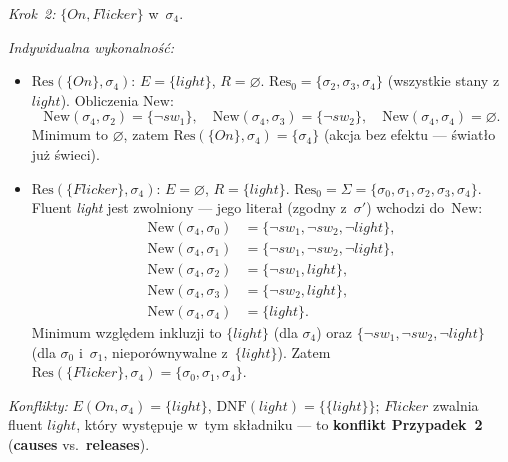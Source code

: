 \documentclass[11pt,a4paper]{article}
\newcommand{\causes}{\textbf{causes}}
\newcommand{\releases}{\textbf{releases}}
\newcommand{\DNF}{\mathrm{DNF}}
\theoremstyle{definition}
\begin{document}
\medskip
\noindent\textit{Krok~2:} $\{\mathit{On}, \mathit{Flicker}\}$ w~$\sigma_4$.

\smallskip\noindent
\emph{Indywidualna wykonalność:}
\begin{itemize}[topsep=2pt]
  \item $\mathrm{Res}(\{\mathit{On}\}, \sigma_4)$: $E = \{\mathit{light}\}$, $R = \varnothing$.
        $\mathrm{Res}_0 = \{\sigma_2, \sigma_3, \sigma_4\}$ (wszystkie stany z~$\mathit{light}$).
        Obliczenia $\mathrm{New}$:
        \[
          \mathrm{New}(\sigma_4, \sigma_2) = \{\neg\mathit{sw_1}\}, \quad
          \mathrm{New}(\sigma_4, \sigma_3) = \{\neg\mathit{sw_2}\}, \quad
          \mathrm{New}(\sigma_4, \sigma_4) = \varnothing.
        \]
        Minimum to $\varnothing$, zatem $\mathrm{Res}(\{\mathit{On}\}, \sigma_4) = \{\sigma_4\}$ (akcja bez efektu --- światło już świeci).
  \item $\mathrm{Res}(\{\mathit{Flicker}\}, \sigma_4)$: $E = \varnothing$, $R = \{\mathit{light}\}$.
        $\mathrm{Res}_0 = \Sigma = \{\sigma_0, \sigma_1, \sigma_2, \sigma_3, \sigma_4\}$.
        Fluent \textit{light} jest zwolniony --- jego literał (zgodny z~$\sigma'$) wchodzi do~$\mathrm{New}$:
        \begin{align*}
          \mathrm{New}(\sigma_4, \sigma_0) &= \{\neg\mathit{sw_1}, \neg\mathit{sw_2}, \neg\mathit{light}\}, \\
          \mathrm{New}(\sigma_4, \sigma_1) &= \{\neg\mathit{sw_1}, \neg\mathit{sw_2}, \neg\mathit{light}\}, \\
          \mathrm{New}(\sigma_4, \sigma_2) &= \{\neg\mathit{sw_1}, \mathit{light}\}, \\
          \mathrm{New}(\sigma_4, \sigma_3) &= \{\neg\mathit{sw_2}, \mathit{light}\}, \\
          \mathrm{New}(\sigma_4, \sigma_4) &= \{\mathit{light}\}.
        \end{align*}
        Minimum względem inkluzji to $\{\mathit{light}\}$ (dla $\sigma_4$) oraz
        $\{\neg\mathit{sw_1}, \neg\mathit{sw_2}, \neg\mathit{light}\}$ (dla $\sigma_0$ i~$\sigma_1$, nieporównywalne z~$\{\mathit{light}\}$).
        Zatem $\mathrm{Res}(\{\mathit{Flicker}\}, \sigma_4) = \{\sigma_0, \sigma_1, \sigma_4\}$.
\end{itemize}

\smallskip\noindent
\emph{Konflikty:} $E(\mathit{On}, \sigma_4) = \{\mathit{light}\}$,
$\DNF(\mathit{light}) = \{\{\mathit{light}\}\}$;
$\mathit{Flicker}$ zwalnia fluent $\mathit{light}$, który występuje w~tym składniku
--- to \textbf{konflikt Przypadek~2} (\causes{} vs.\ \releases{}).
\end{document}
